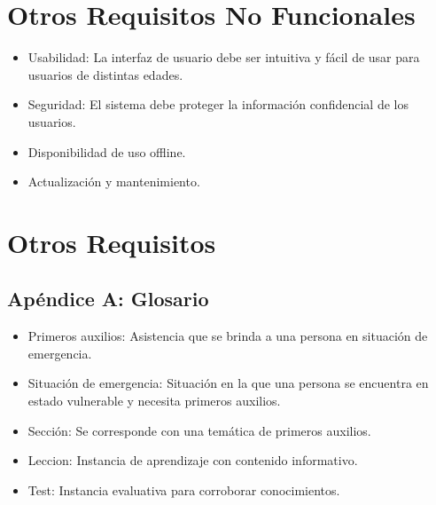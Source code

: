 \documentclass{article}
\begin{document}
\section{Otros Requisitos No Funcionales}
    \begin{itemize}
        \item Usabilidad: La interfaz de usuario debe ser intuitiva y fácil de usar para usuarios de distintas edades.
        \item Seguridad: El sistema debe proteger la información confidencial de los usuarios.
        \item Disponibilidad de uso offline.
        \item Actualización y mantenimiento.
    \end{itemize}
\section{Otros Requisitos}
    \subsection{Apéndice A: Glosario}
        \begin{itemize}
            \item Primeros auxilios: Asistencia que se brinda a una persona en situación de emergencia.
            \item Situación de emergencia: Situación en la que una persona se encuentra en estado vulnerable y necesita primeros auxilios.
            \item Sección: Se corresponde con una temática de primeros auxilios.
            \item Leccion: Instancia de aprendizaje con contenido informativo.
            \item Test: Instancia evaluativa para corroborar conocimientos.
        \end{itemize}
\end{document}
